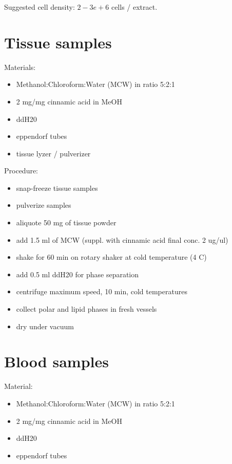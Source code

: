\documentclass[]{book}
\providecommand{\tightlist}{%
  \setlength{\itemsep}{0pt}\setlength{\parskip}{0pt}}
\begin{document}
Suggested cell density: \(2-3e+6\) cells / extract.

\section{Tissue samples}\label{tissue-samples}

Materials:

\begin{itemize}
\tightlist
\item
  Methanol:Chloroform:Water (MCW) in ratio 5:2:1
\item
  2 mg/mg cinnamic acid in MeOH
\item
  ddH20
\item
  eppendorf tubes
\item
  tissue lyzer / pulverizer
\end{itemize}

Procedure:

\begin{itemize}
\tightlist
\item
  snap-freeze tissue samples
\item
  pulverize samples
\item
  aliquote 50 mg of tissue powder
\item
  add 1.5 ml of MCW (suppl. with cinnamic acid final conc. 2 ug/ul)
\item
  shake for 60 min on rotary shaker at cold temperature (4 C)
\item
  add 0.5 ml ddH20 for phase separation
\item
  centrifuge maximum speed, 10 min, cold temperatures
\item
  collect polar and lipid phases in fresh vessels
\item
  dry under vacuum
\end{itemize}

\section{Blood samples}\label{blood-samples}

Material:

\begin{itemize}
\tightlist
\item
  Methanol:Chloroform:Water (MCW) in ratio 5:2:1
\item
  2 mg/mg cinnamic acid in MeOH
\item
  ddH20
\item
  eppendorf tubes
\end{itemize}
\end{document}
